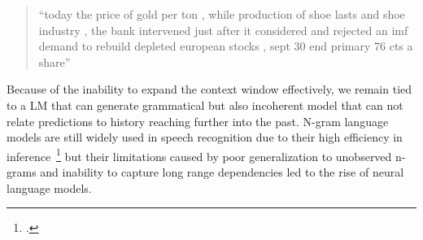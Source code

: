 \begin{quote}
“today the price of gold per ton , while production of shoe lasts and shoe industry , the bank intervened just after it considered and rejected an imf demand to rebuild depleted european stocks , sept 30 end primary 76 cts a share”
\end{quote}

Because of the inability to expand the context window effectively, we remain tied to a LM that can generate grammatical but also incoherent model that can not relate predictions to history reaching further into the past. N-gram language models are still widely used in speech recognition due to their high efficiency in inference~\footcite{wang2019improving} but their limitations caused by poor generalization to unobserved n-grams and inability to capture long range dependencies led to the rise of neural language models.



